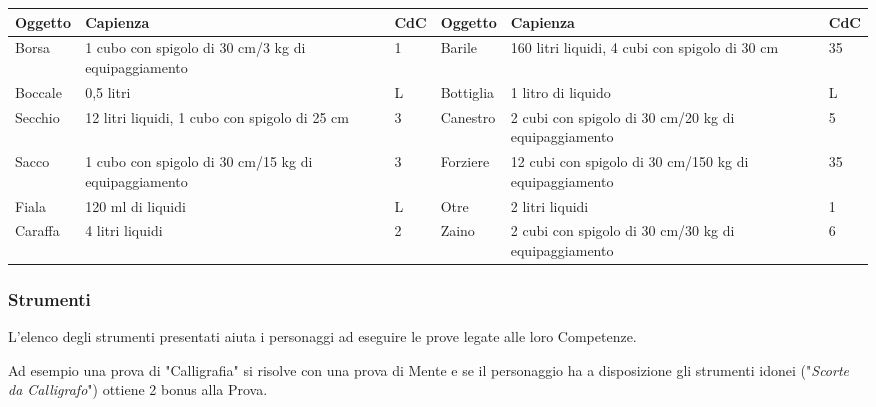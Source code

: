 \documentclass[12pt,a4paper,twoside,openany]{book}
\begin{document}
\begin{tabularx}{0.95\textwidth}{lXl|lXl}
\textbf{Oggetto}&\textbf{Capienza}&\textbf{CdC}&\textbf{Oggetto}&\textbf{Capienza}&\textbf{CdC}\\
\toprule
Borsa&1 cubo con spigolo di 30 cm/3 kg di equipaggiamento&1&Barile&160 litri liquidi, 4 cubi con spigolo di 30 cm&35\\
Boccale&0,5 litri&L&Bottiglia&1 litro di liquido&L\\
Secchio&12 litri liquidi, 1 cubo con spigolo di 25 cm&3&Canestro&2 cubi con spigolo di 30 cm/20 kg di equipaggiamento&5\\
Sacco&1 cubo con spigolo di 30 cm/15 kg di equipaggiamento&3&Forziere&12 cubi con spigolo di 30 cm/150 kg di equipaggiamento&35\\
Fiala&120 ml di liquidi&L&Otre&2 litri liquidi&1\\
Caraffa&4 litri liquidi&2&Zaino&2 cubi con spigolo di 30 cm/30 kg di equipaggiamento&6\\
\end{tabularx}


\begin{multicols}{2}

\subsubsection{Strumenti}

L'elenco degli strumenti presentati aiuta i personaggi ad eseguire le prove legate alle loro Competenze.

Ad esempio una prova di "Calligrafia" si risolve con una prova di Mente e se il personaggio ha a disposizione gli strumenti idonei ("\textit{Scorte da Calligrafo}") ottiene 2 bonus alla Prova.

\end{multicols}

\medskip
\end{document}
